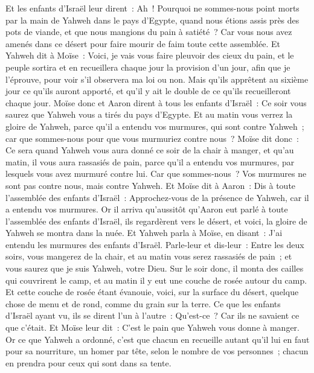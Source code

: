 \begin{multicols}{2}
Et les enfants d'Israël leur dirent~: Ah~! Pourquoi ne sommes-nous point morts par la main de Yahweh dans le pays d'Egypte, quand nous étions assis près des pots de viande, et que nous mangions du pain à satiété~? Car vous nous avez amenés dans ce désert pour faire mourir de faim toute cette assemblée.
Et Yahweh dit à Moïse~: Voici, je vais vous faire pleuvoir des cieux du pain, et le peuple sortira et en recueillera chaque jour la provision d'un jour, afin que je l'éprouve, pour voir s'il observera ma loi ou non.
Mais qu'ils apprêtent au sixième jour ce qu'ils auront apporté, et qu'il y ait le double de ce qu'ils recueilleront chaque jour.
Moïse donc et Aaron dirent à tous les enfants d'Israël~: Ce soir vous saurez que Yahweh vous a tirés du pays d'Egypte.
Et au matin vous verrez la gloire de Yahweh, parce qu'il a entendu vos murmures, qui sont contre Yahweh~; car que sommes-nous pour que vous murmuriez contre nous~?
Moïse dit donc~: Ce sera quand Yahweh vous aura donné ce soir de la chair à manger, et qu'au matin, il vous aura rassasiés de pain, parce qu'il a entendu vos murmures, par lesquels vous avez murmuré contre lui. Car que sommes-nous~? Vos murmures ne sont pas contre nous, mais contre Yahweh.
Et Moïse dit à Aaron~: Dis à toute l'assemblée des enfants d'Israël~: Approchez-vous de la présence de Yahweh, car il a entendu vos murmures.
Or il arriva qu'aussitôt qu'Aaron eut parlé à toute l'assemblée des enfants d'Israël, ils regardèrent vers le désert, et voici, la gloire de Yahweh se montra dans la nuée.
 Et Yahweh parla à Moïse, en disant~:
J'ai entendu les murmures des enfants d'Israël. Parle-leur et dis-leur~: Entre les deux soirs, vous mangerez de la chair, et au matin vous serez rassasiés de pain~; et vous saurez que je suis Yahweh, votre Dieu.
Sur le soir donc, il monta des cailles qui couvrirent le camp, et au matin il y eut une couche de rosée autour du camp.
Et cette couche de rosée étant évanouie, voici, sur la surface du désert, quelque chose de menu et de rond, comme du grain sur la terre.
Ce que les enfants d'Israël ayant vu, ils se dirent l'un à l'autre~: Qu'est-ce~? Car ils ne savaient ce que c'était. Et Moïse leur dit~: C'est le pain que Yahweh vous donne à manger.
Or ce que Yahweh a ordonné, c'est que chacun en recueille autant qu'il lui en faut pour sa nourriture, un homer par tête, selon le nombre de vos personnes~; chacun en prendra pour ceux qui sont dans sa tente.

\end{multicols}
